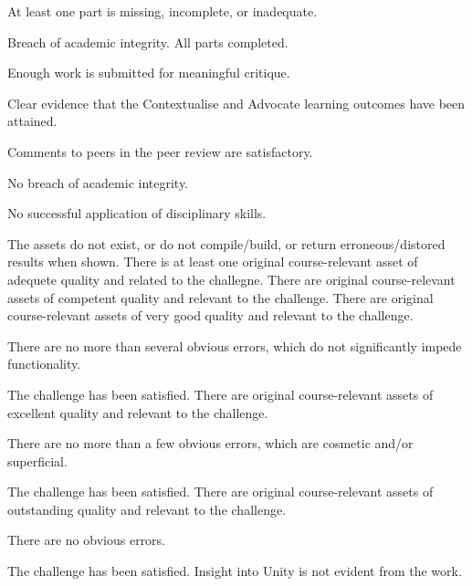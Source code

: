 \documentclass{../../fal_assignment}
\begin{document}
\begin{markingrubric}
%
        \grade \fail At least one part is missing, incomplete, or inadequate.
                   \par Breach of academic integrity.    
        \grade  All parts completed. \par Enough work is submitted for meaningful critique. \par Clear evidence that the Contextualise and Advocate learning outcomes have been attained. \par Comments to peers in the peer review are satisfactory. \par No breach of academic integrity. %
        \grade  
        \grade  
        \grade  
        \grade  
%

        \grade\fail 	No successful application of disciplinary skills.
            \par 		The assets do not exist, or do not compile/build, or return erroneous/distored results when shown.
        \grade 		There is at least one original course-relevant asset of adequete quality and related to the challegne.
        \grade 		There are original course-relevant assets of competent quality and relevant to the challenge.
        \grade 		There are original course-relevant assets of very good quality and relevant to the challenge.
            \par 		There are no more than several obvious errors, which do not significantly impede functionality.
            \par		The challenge has been satisfied.
        \grade 		There are original course-relevant assets of excellent quality and relevant to the challenge.
            \par 		There are no more than a few obvious errors, which are cosmetic and/or superficial.
            \par		The challenge has been satisfied.    
        \grade 		There are original course-relevant assets of outstanding quality and relevant to the challenge.
            \par		There are no obvious errors.
            \par		The challenge has been satisfied.
%
        \grade\fail Insight into Unity is not evident from the work.

\end{markingrubric}
\end{document}

